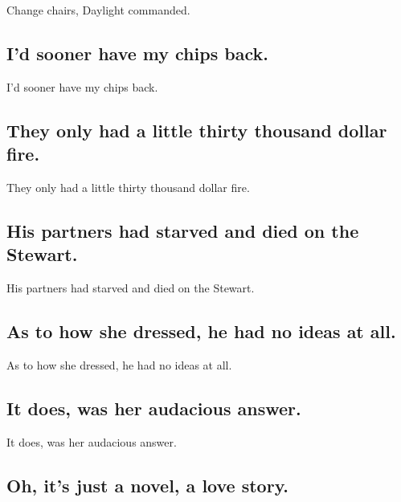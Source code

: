 \documentclass[]{article}
\begin{document}
Change chairs, Daylight commanded.

\hypertarget{id-sooner-have-my-chips-back.}{%
\subsection{I'd sooner have my chips
back.}\label{id-sooner-have-my-chips-back.}}

I'd sooner have my chips back.

\hypertarget{they-only-had-a-little-thirty-thousand-dollar-fire.}{%
\subsection{They only had a little thirty thousand dollar
fire.}\label{they-only-had-a-little-thirty-thousand-dollar-fire.}}

They only had a little thirty thousand dollar fire.

\hypertarget{his-partners-had-starved-and-died-on-the-stewart.}{%
\subsection{His partners had starved and died on the
Stewart.}\label{his-partners-had-starved-and-died-on-the-stewart.}}

His partners had starved and died on the Stewart.

\hypertarget{as-to-how-she-dressed-he-had-no-ideas-at-all.}{%
\subsection{As to how she dressed, he had no ideas at
all.}\label{as-to-how-she-dressed-he-had-no-ideas-at-all.}}

As to how she dressed, he had no ideas at all.

\hypertarget{it-does-was-her-audacious-answer.}{%
\subsection{It does, was her audacious
answer.}\label{it-does-was-her-audacious-answer.}}

It does, was her audacious answer.

\hypertarget{oh-its-just-a-novel-a-love-story.}{%
\subsection{Oh, it's just a novel, a love
story.}\label{oh-its-just-a-novel-a-love-story.}}
\end{document}
